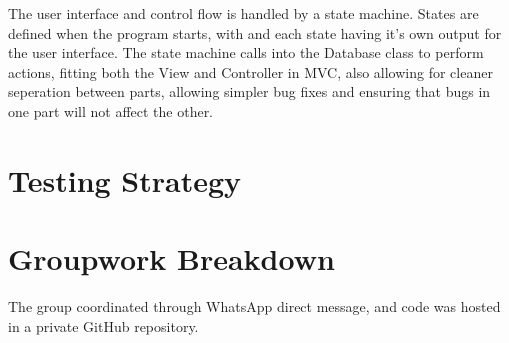 \documentclass{article}
\begin{document}
The user interface and control flow is handled by a state machine. States are defined when the program starts, with and each state having it's own output for the user interface. The state machine calls into the Database class to perform actions, fitting both the View and Controller in MVC, also allowing for cleaner seperation between parts, allowing simpler bug fixes and ensuring that bugs in one part will not affect the other.

\section{Testing Strategy}





\section{Groupwork Breakdown}

The group coordinated through WhatsApp direct message, and code was hosted in a private GitHub repository.
\end{document}
